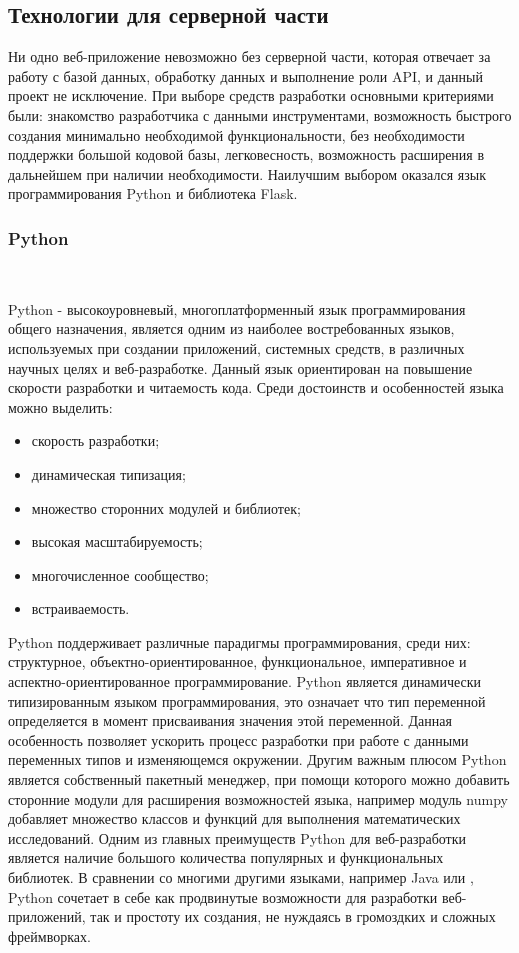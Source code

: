  
\subsection{Технологии для серверной части}
Ни одно веб-приложение невозможно без серверной части, которая отвечает за работу с базой данных, обработку данных и выполнение роли API, и данный проект не исключение. При выборе средств разработки основными критериями были: знакомство разработчика с данными инструментами, возможность быстрого создания минимально необходимой функциональности, без необходимости поддержки большой кодовой базы, легковесность, возможность расширения в дальнейшем при наличии необходимости. Наилучшим выбором оказался язык программирования Python и библиотека Flask.
 
\subsubsection{Python}~\par
Python - высокоуровневый, многоплатформенный язык программирования общего назначения, является одним из наиболее востребованных языков, используемых при создании приложений, системных средств, в различных научных целях и веб-разработке\cite{python}. Данный язык ориентирован на повышение скорости разработки и читаемость кода. Среди достоинств и особенностей языка можно выделить:
\begin{itemize}
 \item скорость разработки;
 \item динамическая типизация;
 \item множество сторонних модулей и библиотек;
 \item высокая масштабируемость;
 \item многочисленное сообщество;
 \item встраиваемость.
\end{itemize}
 
Python поддерживает различные парадигмы программирования, среди них: структурное, объектно-ориентированное, функциональное, императивное и аспектно-ориентированное программирование. Python является динамически типизированным языком программирования, это означает что тип переменной определяется в момент присваивания значения этой переменной. Данная особенность позволяет ускорить процесс разработки при работе с данными переменных типов и изменяющемся окружении\cite{python2}. Другим важным плюсом Python является собственный пакетный менеджер, при помощи которого можно добавить сторонние модули для расширения возможностей языка, например модуль numpy добавляет множество классов и функций для выполнения математических исследований. Одним из главных преимуществ Python для веб-разработки является наличие большого количества популярных и функциональных библиотек. В сравнении со многими другими языками, например Java или \csharp{}, Python сочетает в себе как продвинутые возможности для разработки веб-приложений, так и простоту их создания, не нуждаясь в громоздких и сложных фреймворках.
 
